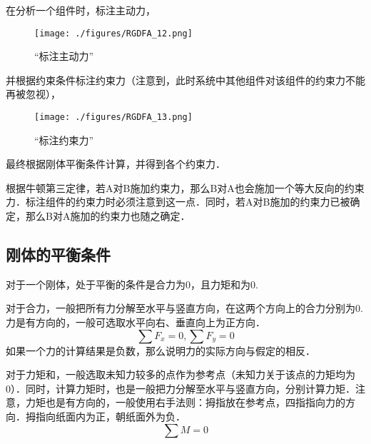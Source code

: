 在分析一个组件时，标注主动力，
\begin{figure}[ht]
\centering
\texttt{[image: ./figures/RGDFA\_12.png]}
\caption{“标注主动力”} \label{RGDFA_fig12}
\end{figure}
并根据约束条件标注约束力（注意到，此时系统中其他组件对该组件的约束力不能再被忽视），
\begin{figure}[ht]
\centering
\texttt{[image: ./figures/RGDFA\_13.png]}
\caption{“标注约束力”} \label{RGDFA_fig13}
\end{figure}
最终根据刚体平衡条件计算，并得到各个约束力．

根据牛顿第三定律，若A对B施加约束力，那么B对A也会施加一个等大反向的约束力．标注组件的约束力时必须注意到这一点．同时，若A对B施加的约束力已被确定，那么B对A施加的约束力也随之确定．

\subsection{刚体的平衡条件}
对于一个刚体，处于平衡的条件是合力为0，且力矩和为0.

对于合力，一般把所有力分解至水平与竖直方向，在这两个方向上的合力分别为0.力是有方向的，一般可选取水平向右、垂直向上为正方向．
\begin{equation}
\sum F_x=0, \sum F_y=0
\end{equation}
如果一个力的计算结果是负数，那么说明力的实际方向与假定的相反．

对于力矩和，一般选取未知力较多的点作为参考点（未知力关于该点的力矩均为0）．同时，计算力矩时，也是一般把力分解至水平与竖直方向，分别计算力矩．注意，力矩也是有方向的，一般使用右手法则：拇指放在参考点，四指指向力的方向．拇指向纸面内为正，朝纸面外为负．
\begin{equation}
\sum M=0
\end{equation}

